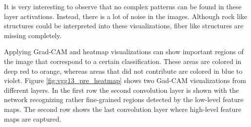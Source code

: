 \begin{figure}[H]
\label{fig:vgg13_fromscratch_filters}
\end{figure}

It is very interesting to observe that no complex patterns can be found in these layer activations. Instead, there is a lot of noise in the images. Although rock like structures could be interpreted into these visualizations, fiber like structures are missing completely.

Applying Grad-CAM and heatmap visualizations can show important regions of the image that correspond to a certain classification. These areas are colored in deep red to orange, whereas areas that did not contribute are colored in blue to violet. Figure \ref{fig:vgg13_pre_heatmap} shows two Gad-CAM visualizations from different layers. In the first row the second convolution layer is shown with the network recognizing rather fine-grained regions detected by the low-level feature maps. The second row shows the last convolution layer where high-level feature maps are captured.

